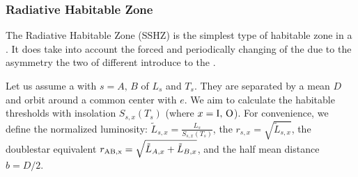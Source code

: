 \documentclass[letterpaper,10pt,english]{sphinxmanual}
\begin{document}
\subsubsection{Radiative Habitable Zone}
\label{\detokenize{quantities/habitability/habitable_zones/radiative_habitable_zone:radiative-habitable-zone}}\label{\detokenize{quantities/habitability/habitable_zones/radiative_habitable_zone::doc}}\label{\detokenize{quantities/habitability/habitable_zones/radiative_habitable_zone:id1}}
\sphinxAtStartPar
The Radiative Habitable Zone (SSHZ) is the simplest type of habitable zone in a {\hyperref[\detokenize{celestial_systems/binary_system:id1}]{}}.
It does  take into account the forced and periodically changing {\hyperref[\detokenize{quantities/orbital/eccentricity:id1}]{}}
of the {\hyperref[\detokenize{celestial_bodies/planet:id1}]{}} due to the asymmetry
the two {\hyperref[\detokenize{celestial_bodies/star:id1}]{}} of different {\hyperref[\detokenize{quantities/material/mass:id1}]{}} introduce to the {\hyperref[\detokenize{celestial_systems/stellar_system:id1}]{}}.

\sphinxAtStartPar
Let us assume a {\hyperref[\detokenize{celestial_systems/binary_system:id1}]{}} with {\hyperref[\detokenize{celestial_bodies/star:id1}]{}} \(s = A,\, B\)
of {\hyperref[\detokenize{quantities/surface/emission/luminosity:id1}]{}} \(L_s\) and
{\hyperref[\detokenize{quantities/surface/emission/temperature:id1}]{}} \(T_s\).
They are separated by a mean {\hyperref[\detokenize{quantities/orbital/semi_major_axis:id1}]{}} \(D\)
and orbit around a common center with {\hyperref[\detokenize{quantities/orbital/eccentricity:id1}]{}} \(e\).
We aim to calculate the  habitable thresholds with insolation
\(S_{s,x}(T_s)\) (where \(x = {\rm I, \, O}\)).
For convenience, we define the
normalized luminosity: \(\tilde L_{s,x} = \frac{L_s}{S_{s,x}(T_s)}\), the
{\hyperref[\detokenize{quantities/habitability/habitable_zones/single_star_habitable_zone:id1}]{}} \(r_{s, x} = \sqrt{\tilde L_{s,x}}\),
the double\sphinxhyphen{}star equivalent \(r_{\rm AB, x} = \sqrt{\tilde L_{A,x} + \tilde L_{B,x}}\),
and the half mean distance \(b = D/2\).
\end{document}

